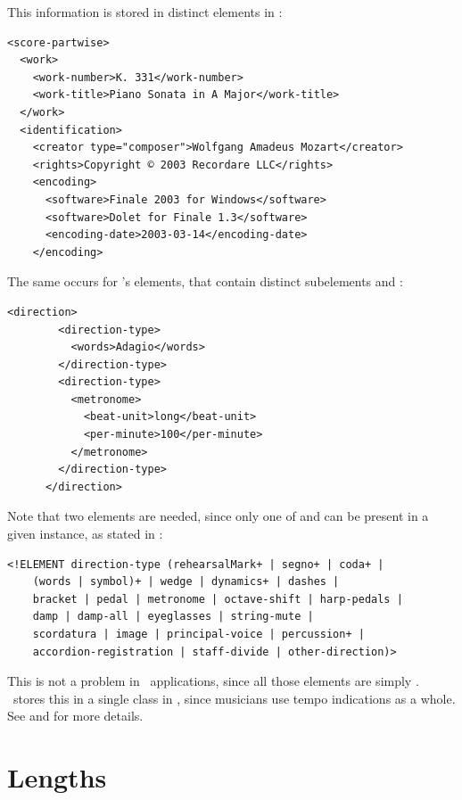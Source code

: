 This information is stored in distinct elements in \mxml:
\begin{lstlisting}[language=MusicXML]
<score-partwise>
  <work>
    <work-number>K. 331</work-number>
    <work-title>Piano Sonata in A Major</work-title>
  </work>
  <identification>
    <creator type="composer">Wolfgang Amadeus Mozart</creator>
    <rights>Copyright © 2003 Recordare LLC</rights>
    <encoding>
      <software>Finale 2003 for Windows</software>
      <software>Dolet for Finale 1.3</software>
      <encoding-date>2003-03-14</encoding-date>
    </encoding>
\end{lstlisting}

The same occurs for \mxml's  elements, that contain distinct subelements  and :
\begin{lstlisting}[language=MusicXML]
      <direction>
        <direction-type>
          <words>Adagio</words>
        </direction-type>
        <direction-type>
          <metronome>
            <beat-unit>long</beat-unit>
            <per-minute>100</per-minute>
          </metronome>
        </direction-type>
      </direction>
\end{lstlisting}

Note that two  elements are needed, since only one of  and  can be present in a given instance, as stated in :
\begin{lstlisting}[language=MusicXML]
<!ELEMENT direction-type (rehearsalMark+ | segno+ | coda+ |
	(words | symbol)+ | wedge | dynamics+ | dashes |
	bracket | pedal | metronome | octave-shift | harp-pedals |
	damp | damp-all | eyeglasses | string-mute |
	scordatura | image | principal-voice | percussion+ |
	accordion-registration | staff-divide | other-direction)>
\end{lstlisting}

This is not a problem in \GUI\ applications, since all those elements are simply \drawn. \msrRepr\ stores this in a single  class   in , since musicians use tempo indications as a whole.
See  and  for more details.


\section{Lengths}\label{Lengths}

